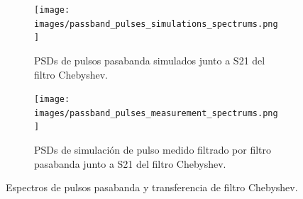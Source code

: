 \begin{figure}[t]
\end{figure}

\begin{figure}[t]
    \centering
    \begin{subfigure}[b]{0.45\textwidth}
        \centering
        \texttt{[image: images/passband\_pulses\_simulations\_spectrums.png]}
        \caption{PSDs de pulsos pasabanda simulados junto a S21 del filtro
        Chebyshev.}
        \label{fig:passband_spectrums_simulation}
    \end{subfigure}
    \hfill
    \begin{subfigure}[b]{0.45\textwidth}
        \centering
        \texttt{[image: images/passband\_pulses\_measurement\_spectrums.png]}
        \caption{PSDs de simulación de pulso medido filtrado por filtro
        pasabanda junto a S21 del filtro Chebyshev.}
        \label{fig:passband_spectrums_measurement}
    \end{subfigure}
    \caption{Espectros de pulsos pasabanda y transferencia de filtro Chebyshev.}
    \label{fig:passband_spectrums}
\end{figure}
